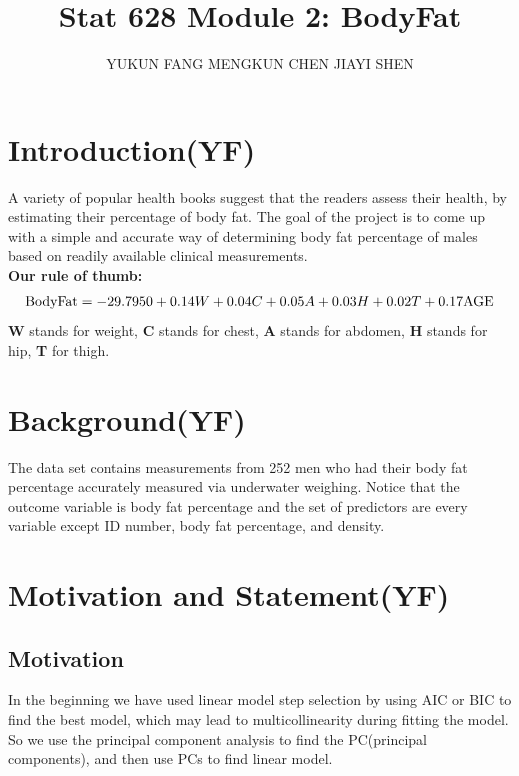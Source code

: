 \documentclass[12pt]{article}
\title{\vspace{-4em}Stat 628 Module 2: BodyFat}
\author{YUKUN FANG \quad MENGKUN CHEN \quad JIAYI SHEN}
\date{}
\begin{document}
\sffamily

\maketitle
\vspace{-1.5em}
\section{\sffamily Introduction(YF)}
A variety of popular health books suggest that the readers assess their 
health, by estimating their percentage of body fat.
The goal of the project is to come up with 
a simple and accurate way of determining body fat percentage of males
based on readily available clinical measurements.\\
\textbf{Our rule of thumb:} $$ {\rm BodyFat} = -29.7950 + 0.14W + 0.04C + 0.05A+ 0.03H +0.02T + 0.17{\rm AGE}$$
\textbf{W} stands for weight, \textbf{C} stands for chest, \textbf{A} stands for abdomen, \textbf{H} stands for hip, \textbf{T} for thigh.

\vspace{-0.7em}
\section{\sffamily Background(YF)}
The data set contains measurements from 252 men who had their body fat 
percentage accurately measured via underwater weighing. Notice that the 
outcome variable is body fat percentage and the set of predictors are 
every variable except ID number, body fat percentage, and density.
\vspace{-0.7em}
\section{\sffamily Motivation and Statement(YF)}
\subsection{\sffamily Motivation}\vspace{-0.25em}
In the beginning we have used linear model step selection by using 
AIC or BIC to find the best model, which may lead to multicollinearity during fitting the model.
So we use the principal component analysis to find the PC(principal components), and
then use PCs to find linear model.

\vspace{-1em}
\end{document}
